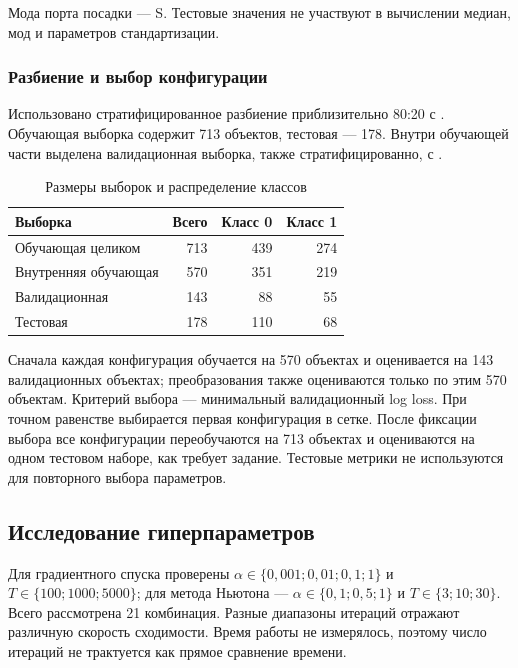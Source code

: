 \begin{table}[H]
\centering\small
\caption{Параметры преобразования при обучении на 713 объектах}

\end{table}
Мода порта посадки — S. Тестовые значения не участвуют в вычислении медиан, мод и параметров стандартизации.

\subsubsection{Разбиение и выбор конфигурации}
Использовано стратифицированное разбиение приблизительно 80:20 с . Обучающая выборка содержит 713 объектов, тестовая — 178. Внутри обучающей части выделена валидационная выборка, также стратифицированно, с .
\begin{table}[H]
\centering
\caption{Размеры выборок и распределение классов}
\begin{tabular}{lrrr}
\toprule Выборка & Всего & Класс 0 & Класс 1 \\ \midrule
Обучающая целиком & 713 & 439 & 274 \\
Внутренняя обучающая & 570 & 351 & 219 \\
Валидационная & 143 & 88 & 55 \\
Тестовая & 178 & 110 & 68 \\ \bottomrule
\end{tabular}
\end{table}
Сначала каждая конфигурация обучается на 570 объектах и оценивается на 143 валидационных объектах; преобразования также оцениваются только по этим 570 объектам. Критерий выбора — минимальный валидационный log loss. При точном равенстве выбирается первая конфигурация в сетке. После фиксации выбора все конфигурации переобучаются на 713 объектах и оцениваются на одном тестовом наборе, как требует задание. Тестовые метрики не используются для повторного выбора параметров.

\newpage
\subsection{Исследование гиперпараметров}
Для градиентного спуска проверены $\alpha\in\{0{,}001;0{,}01;0{,}1;1\}$ и $T\in\{100;1000;5000\}$; для метода Ньютона — $\alpha\in\{0{,}1;0{,}5;1\}$ и $T\in\{3;10;30\}$. Всего рассмотрена 21 комбинация. Разные диапазоны итераций отражают различную скорость сходимости. Время работы не измерялось, поэтому число итераций не трактуется как прямое сравнение времени.

